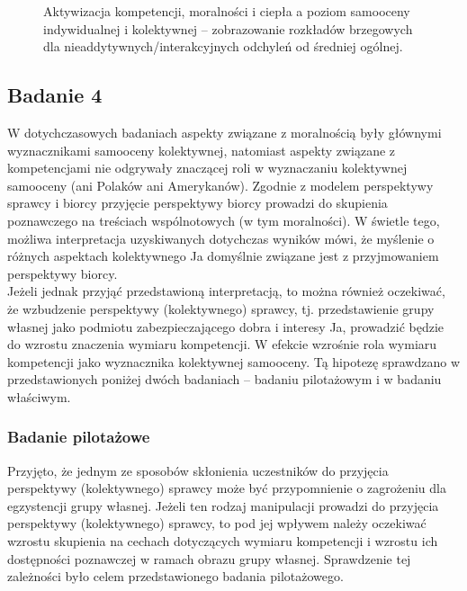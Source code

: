 \documentclass[man]{apa6}
\begin{document}
\begin{figure*}[htbp]
   \centering
   \caption{Aktywizacja kompetencji, moralności i ciepła a poziom samooceny indywidualnej i kolektywnej -- zobrazowanie rozkładów brzegowych dla nieaddytywnych/interakcyjnych odchyleń od średniej ogólnej.}
   \label{fig:study3}
\end{figure*}



\newpage
\subsection{Badanie 4}

W dotychczasowych badaniach aspekty związane z moralnością były głównymi wyznacznikami samooceny kolektywnej, natomiast aspekty związane z kompetencjami nie odgrywały znaczącej roli w wyznaczaniu kolektywnej samooceny (ani Polaków ani Amerykanów). Zgodnie z modelem perspektywy sprawcy i biorcy \parencite{abele2014communal} przyjęcie perspektywy biorcy prowadzi do skupienia poznawczego na treściach wspólnotowych (w tym moralności). W świetle tego, możliwa interpretacja uzyskiwanych dotychczas wyników mówi, że myślenie o różnych aspektach kolektywnego Ja domyślnie związane jest z przyjmowaniem perspektywy biorcy.\\

Jeżeli jednak przyjąć przedstawioną interpretacją, to można również oczekiwać, że wzbudzenie perspektywy (kolektywnego) sprawcy, tj. przedstawienie grupy własnej jako podmiotu zabezpieczającego dobra i interesy Ja, prowadzić będzie do wzrostu znaczenia wymiaru kompetencji. W efekcie wzrośnie rola wymiaru kompetencji jako wyznacznika kolektywnej samooceny. Tą hipotezę sprawdzano w przedstawionych poniżej dwóch badaniach -- badaniu pilotażowym i w badaniu właściwym.\\

\subsubsection{Badanie pilotażowe}
Przyjęto, że jednym ze sposobów skłonienia uczestników do przyjęcia perspektywy (kolektywnego) sprawcy może być przypomnienie o zagrożeniu dla egzystencji grupy własnej. Jeżeli ten rodzaj manipulacji prowadzi do przyjęcia perspektywy (kolektywnego) sprawcy, to pod jej wpływem należy oczekiwać wzrostu skupienia na cechach dotyczących wymiaru kompetencji i wzrostu ich dostępności poznawczej w ramach obrazu grupy własnej. Sprawdzenie tej zależności było celem przedstawionego badania pilotażowego.
\end{document}

